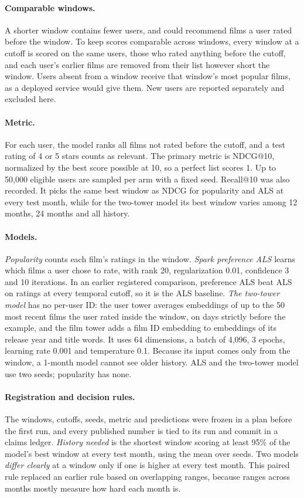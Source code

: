 \documentclass[11pt]{article}
\begin{document}
\paragraph{Comparable windows.} A shorter window contains fewer users, and could recommend films a
user rated before the window. To keep scores comparable across windows, every window at a cutoff
is scored on the same users, those who rated anything before the cutoff, and each user's earlier
films are removed from their list however short the window. Users absent from a window receive
that window's most popular films, as a deployed service would give them. New users are reported
separately and excluded here.

\paragraph{Metric.} For each user, the model ranks all films not rated before the cutoff, and a
test rating of 4 or 5 stars counts as relevant. The primary metric is NDCG@10, normalized by the
best score possible at 10, so a perfect list scores 1. Up to 50,000 eligible users are sampled
per arm with a fixed seed. Recall@10 was also recorded. It picks the same best window as NDCG
for popularity and ALS at every test month, while for the two-tower model its best window varies
among 12 months, 24 months and all history.

\paragraph{Models.}
\emph{Popularity} counts each film's ratings in the window.
\emph{Spark preference ALS} \citep{hu2008implicit} learns which films a user chose to rate, with
rank 20, regularization 0.01, confidence 3 and 10 iterations. In an earlier registered
comparison, preference ALS beat ALS on ratings \citep{zhou2008als} at every temporal cutoff, so it
is the ALS baseline.
\emph{The two-tower model} has no per-user ID: the user tower averages embeddings of up to the 50
most recent films the user rated inside the window, on days strictly before the example, and the
film tower adds a film ID embedding to embeddings of its release year and title words. It uses 64
dimensions, a batch of 4,096, 3 epochs, learning rate 0.001 and temperature 0.1. Because its input
comes only from the window, a 1-month model cannot see older history. ALS and the two-tower model
use two seeds; popularity has none.

\paragraph{Registration and decision rules.} The windows, cutoffs, seeds, metric and predictions
were frozen in a plan before the first run, and every published number is tied to its run and
commit in a claims ledger. \emph{History needed} is the shortest window scoring at least 95\% of
the model's best window at every test month, using the mean over seeds. Two models \emph{differ
clearly} at a window only if one is higher at every test month. This paired rule replaced an
earlier rule based on overlapping ranges, because ranges across months mostly measure how hard
each month is.
\end{document}
